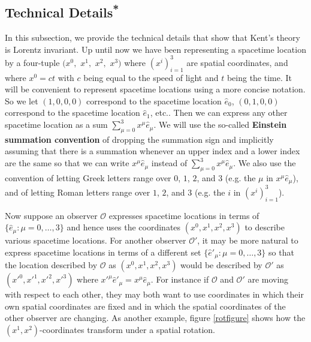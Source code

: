 \subsection{Technical Details\textsuperscript{*}}
In this subsection, we provide the technical details that show that Kent's theory is Lorentz invariant. Up until now we have been representing a spacetime location by a four-tuple $(x^0,$ $x^1,$ $x^2,$ $x^3)$ where $(x^i)_{i=1}^3$ are spatial coordinates, and where $x^0=ct$ with $c$ being equal to the speed of light and $t$ being the time. It will be convenient to represent spacetime locations using a more concise notation. So we let $(1,0,0,0)$ correspond to the spacetime location $\hat{e}_0$, $(0,1,0,0)$ %
%
 correspond to the spacetime location $\hat{e}_1$, etc.. Then we can express any other spacetime location  as a sum $\sum_{\mu=0}^3x^\mu\hat{e}_\mu$. We will use the so-called \textbf{Einstein summation convention}\label{Einsteinsum} of dropping the summation sign and implicitly assuming that there is a summation whenever an upper index and a lower index are the same so that we can write $x^\mu\hat{e}_\mu$ %
  instead of $\sum_{\mu=0}^3x^\mu\hat{e}_\mu$. We also use the convention of letting Greek letters range over $0$, $1$, $2$, and $3$ (e.g. the $\mu$ in $x^\mu\hat{e}_\mu$), and of letting Roman letters range over $1$, $2$, and $3$ (e.g. the $i$ in $(x^i)_{i=1}^3$). %

Now suppose an observer $\mathcal{O}$ %
%
 expresses spacetime locations in terms of $\{\hat{e}_\mu:\mu=0,\ldots,3\}$ and hence uses the coordinates $(x^0, x^1, x^2, x^3)$ to describe various spacetime locations. For another observer $\mathcal{O}'$, it may be more natural to express spacetime locations in terms of a different set $\{\hat{e}'_\mu:\mu=0,\ldots,3\}$ so that the location described by $\mathcal{O}$ as $(x^0, x^1, x^2, x^3)$ would be described by $\mathcal{O}'$ as $({x'}^0, {x'}^1, {x'}^2, {x'}^3)$ where ${x'}^\mu{\hat{e}'}_\mu=x^\mu\hat{e}_\mu$.  For instance if $\mathcal{O}$ and $\mathcal{O}'$ are moving with respect to each other, they may both want to use coordinates in which their own spatial coordinates are fixed and in which the spatial coordinates of the other observer are changing. As another example, figure \ref{rotfigure} shows how the $(x^1, x^2)$-coordinates transform under a spatial rotation. 


